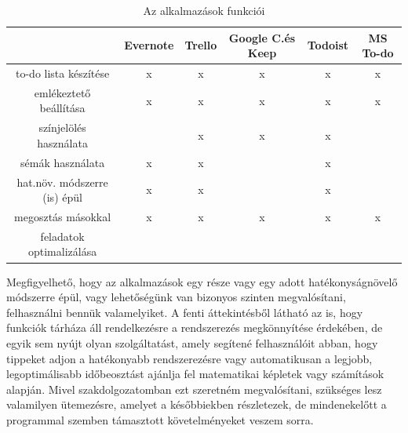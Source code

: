 \begin{table}[h]
	\centering
	\caption{Az alkalmazások funkciói}
	\label{tab:minta}
	\tabcolsep=0.1cm
	\begin{tabular}{|c|c|c|c|c|c|}
		\hline
		 & Evernote & Trello & Google C.és Keep & Todoist & MS To-do \\
		\hline
		to-do lista készítése & x & x & x & x & x \\
		\hline
		emlékeztető beállítása &x & x & x & x & x \\
		\hline
		színjelölés használata &  & x & x & x &   \\
		\hline
		sémák használata & x & x &   & x &   \\
		\hline
		hat.növ. módszerre (is) épül & x & x &   & x &   \\
		\hline
		megosztás másokkal & x & x & x & x & x \\
		\hline
		feladatok optimalizálása &  &   &   &   &   \\
		\hline
	\end{tabular}
\end{table}

Megfigyelhető, hogy az alkalmazások egy része vagy egy adott hatékonyságnövelő módszerre épül, vagy lehetőségünk van bizonyos szinten megvalósítani, felhasználni bennük valamelyiket. A fenti áttekintésből látható az is, hogy funkciók tárháza áll rendelkezésre a rendszerezés megkönnyítése érdekében, de egyik sem nyújt olyan szolgáltatást, amely segítené felhasználóit abban, hogy tippeket adjon a hatékonyabb rendszerezésre vagy automatikusan a legjobb, legoptimálisabb időbeosztást ajánlja fel matematikai képletek vagy számítások alapján. Mivel szakdolgozatomban ezt szeretném megvalósítani, szükséges lesz valamilyen ütemezésre, amelyet a későbbiekben részletezek, de mindenekelőtt a programmal szemben támasztott követelményeket veszem sorra.
